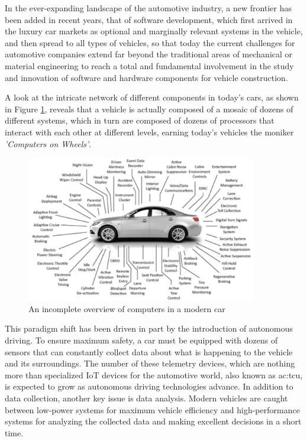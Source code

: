 In the ever-expanding landscape of the automotive industry, a new frontier has been added in recent years, that of software development, which first arrived in the luxury car markets as optional and marginally relevant systems in the vehicle, and then spread to all types of vehicles, so that today the current challenges for automotive companies extend far beyond the traditional areas of mechanical or material engineering to reach a total and fundamental involvement in the study and innovation of software and hardware components for vehicle construction. 

A look at the intricate network of different components in today's cars, as shown in Figure \ref{fig:VheicleProcessors}, reveals that a vehicle is actually composed of a mosaic of dozens of different systems, which in turn are composed of dozens of processors that interact with each other at different levels, earning today's vehicles the moniker \textit{'Computers on Wheels'}.
\begin{figure}[h]  %
  \centering
  \includegraphics[width=0.9\textwidth]{images/vehicle_processors.png}  %
  \caption{An incomplete overview of computers in a modern car \cite{ieeeSoftwareDefinedVehicle}}
  \label{fig:VheicleProcessors}
\end{figure}

This paradigm shift has been driven in part by the introduction of autonomous driving. To ensure maximum safety, a car must be equipped with dozens of sensors that can constantly collect data about what is happening to the vehicle and its surroundings. The number of these telemetry devices, which are nothing more than specialized IoT devices for the automotive world, also known as \gls{ac:tcu}, is expected to grow as autonomous driving technologies advance. In addition to data collection, another key issue is data analysis. Modern vehicles are caught between low-power systems for maximum vehicle efficiency and high-performance systems for analyzing the collected data and making excellent decisions in a short time.

